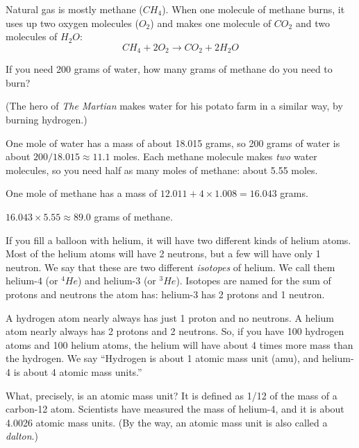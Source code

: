 \begin{Exercise}[title={Burning Methane}, label=burning_methane]

Natural gas is mostly methane ($CH_4$). When one molecule of methane
burns, it uses up two oxygen molecules ($O_2$) and makes one molecule of
$CO_2$ and two molecules of $H_2O$:
$$CH_4 + 2O_2 \rightarrow CO_2 + 2H_2O$$

If you need 200 grams of water, how many grams of methane do you need
to burn?

(The hero of \emph{The Martian} makes water for his potato farm in a similar way, by burning hydrogen.)
\vspace{50mm}
\end{Exercise}

\begin{Answer}[ref=burning_methane]

One mole of water has a mass of about 18.015 grams, so 200 grams of water is about $200 / 18.015 \approx 11.1$ moles. Each methane molecule makes \emph{two} water molecules, so you need half as many moles of methane: about 5.55 moles.

One mole of methane has a mass of $12.011 + 4 \times 1.008 = 16.043$ grams.

$16.043 \times 5.55 \approx 89.0$ grams of methane.

\end{Answer}


If you fill a balloon with helium, it will have two different
kinds of helium atoms. Most of the helium atoms will have 2 neutrons, but a
few will have only 1 neutron. We say that these are two different
\textit{isotopes} of helium. We call them helium-4 (or $^4He$) and
helium-3 (or $^3He$). Isotopes are named for the sum of protons and
neutrons the atom has: helium-3 has 2 protons and 1 neutron.

A hydrogen atom nearly always has just 1 proton and no neutrons. A
helium atom nearly always has 2 protons and 2 neutrons. So, if you
have 100 hydrogen atoms and 100 helium atoms, the helium will have
about 4 times more mass than the hydrogen. We say ``Hydrogen is about
1 atomic mass unit (amu), and helium-4 is about 4 atomic mass
units.''

What, precisely, is an atomic mass unit? It is defined as 1/12 of
the mass of a carbon-12 atom. Scientists have measured the mass of
helium-4, and it is about 4.0026 atomic mass units. (By the way, an
atomic mass unit is also called a \textit{dalton}.)

